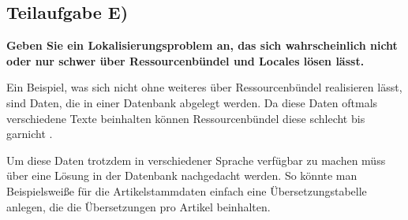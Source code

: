 \subsection{Teilaufgabe E)}
\textbf{Geben Sie ein Lokalisierungsproblem an, das sich wahrscheinlich nicht oder nur schwer
über Ressourcenbündel und Locales lösen lässt.}

Ein Beispiel, was sich nicht ohne weiteres über Ressourcenbündel realisieren
lässt, sind Daten, die in einer Datenbank abgelegt werden. Da diese Daten
oftmals verschiedene Texte beinhalten können Ressourcenbündel diese schlecht bis
garnicht . 

Um diese Daten trotzdem in verschiedener Sprache verfügbar zu machen müss über
eine Lösung in der Datenbank nachgedacht werden. So könnte man Beispielsweiße
für die Artikelstammdaten einfach eine Übersetzungstabelle anlegen, die die
Übersetzungen pro Artikel beinhalten.

\clearpage